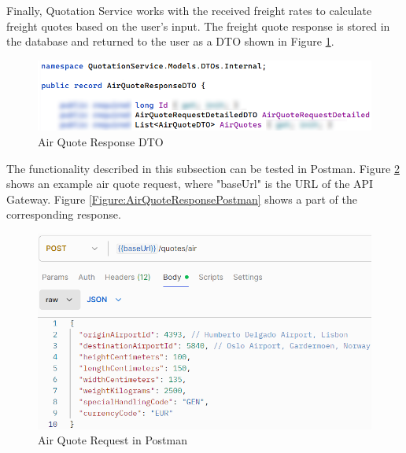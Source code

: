 \documentclass[12pt, reqno, oneside]{amsbook}
\theoremstyle{definition}
\theoremstyle{definition}
\numberwithin{section}{chapter}
\numberwithin{table}{chapter}
\numberwithin{figure}{chapter}
\begin{document}
Finally, Quotation Service works with the received freight rates to calculate freight quotes based on the user's input. The freight quote response is stored in the database and returned to the user as a \ac{DTO} shown in Figure \ref{Figure:AirQuoteResponseDTO}.

\begin{figure}[H]
  \centering
  \includegraphics[width=0.9\linewidth]{images/AirQuoteResponseDTO.png}
  \caption{\label{Figure:AirQuoteResponseDTO}Air Quote Response DTO}
\end{figure}

The functionality described in this subsection can be tested in Postman. Figure \ref{Figure:AirQuoteRequestPostman} shows an example air quote request, where "baseUrl" is the \ac{URL} of the API Gateway. Figure \ref{Figure:AirQuoteResponsePostman} shows a part of the corresponding response.


\begin{figure}[H]
  \centering
  \includegraphics[width=0.9\linewidth]{images/AirQuoteRequestPostman.png}
  \caption{\label{Figure:AirQuoteRequestPostman}Air Quote Request in Postman}
\end{figure}
\end{document}
